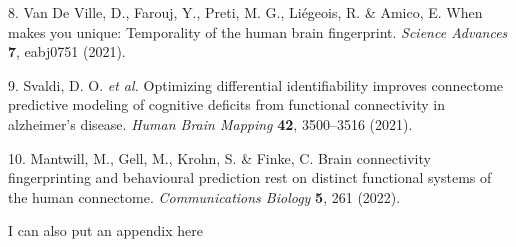 \begin{hangparas}{1em}{1}
\leavevmode\hypertarget{ref-vandeville_2021}{}%
8. Van De Ville, D., Farouj, Y., Preti, M. G., Liégeois, R. \& Amico, E.
When makes you unique: Temporality of the human brain fingerprint.
\emph{Science Advances} \textbf{7}, eabj0751 (2021).

\leavevmode\hypertarget{ref-svaldi_2021}{}%
9. Svaldi, D. O. \emph{et al.} Optimizing differential identifiability
improves connectome predictive modeling of cognitive deficits from
functional connectivity in alzheimer's disease. \emph{Human Brain
Mapping} \textbf{42}, 3500--3516 (2021).

\leavevmode\hypertarget{ref-mantwill_2022}{}%
10. Mantwill, M., Gell, M., Krohn, S. \& Finke, C. Brain connectivity
fingerprinting and behavioural prediction rest on distinct functional
systems of the human connectome. \emph{Communications Biology}
\textbf{5}, 261 (2022).

\end{hangparas}

\pagebreak

I can also put an appendix here
